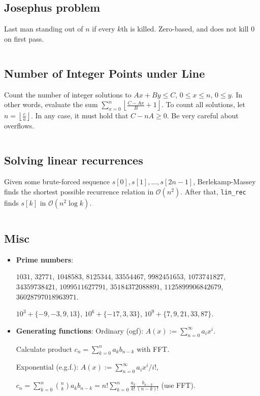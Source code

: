 \documentclass[8pt,a4paper,landscape,oneside]{amsart}
\newcommand{\mintedstyle}[2]{\inputminted[fontsize=\normalsize,baselinestretch=.9,breaklines,tabsize=2]{#1}{code/#2}}
\newcommand{\code}[1]{\mintedstyle{cpp}{#1}}
\newenvironment{myitemize}
{\begin{itemize}[leftmargin=.3cm]
	\setlength{\itemsep}{0pt}
	\setlength{\parskip}{0pt}
	\setlength{\parsep}{0pt}     }
{ \end{itemize}                  }
\begin{document}
\begin{multicols*}{3}
\subsection{Josephus problem}
Last man standing out of $n$ if every $k$th is killed. Zero-based, and
does not kill $0$ on first pass.
\code{math/josephus.cpp}

\subsection{Number of Integer Points under Line}
Count the number of integer solutions to $Ax+By\leq C$, $0 \leq x \leq
n$, $0 \leq y$. In other words, evaluate the sum $\sum_{x=0}^n
\left\lfloor \frac{C-Ax}{B} + 1\right\rfloor$. To count all solutions,
let $n = \left\lfloor \frac{c}{a}\right\rfloor$. In any case, it must hold
that $C-nA \geq 0$. Be very careful about overflows.
\code{math/floor_sum.cpp}

\subsection{Solving linear recurrences}
Given some brute-forced sequence $s[0], s[1], \dots, s[2n-1]$, Berlekamp-Massey finds the shortest possible recurrence relation in $\mathcal{O}(n^2)$.
After that, \texttt{lin\_rec} finds $s[k]$ in $\mathcal{O}(n^2 \log k)$.
\code{other/berlekamp-massey.cpp}

\subsection{Misc}

\begin{myitemize}
	\item \textbf{Prime numbers}:

	$1031$, $32771$, $1048583$, $8125344$, $33554467$, $9982451653$, $1073741827$, $34359738421$, $1099511627791$, $35184372088891$, $1125899906842679$, $36028797018963971$.

	$10^3 + \{-9,-3,9,13\}$, $10^6 + \{-17,3,33\}$, $10^9+ \{7,9,21,33,87\}$.

	\item \textbf{Generating functions}:
	Ordinary (ogf): $A(x) := \sum_{n=0}^{\infty} a_i x^i$.

	Calculate product $c_n = \sum_{k=0}^{n} a_k b_{n-k}$ with FFT.

	Exponential (e.g.f.): $A(x) := \sum_{n=0}^{\infty} a_i x^i/i!$,

	$c_n = \sum_{k=0}^{n} \binom{n}{k} a_k b_{n-k} = n! \sum_{k=0}^{n} \frac{a_k}{k!} \frac{b_{n-k}}{(n-k)!}$ (use FFT).


\end{myitemize}
\end{multicols*}
\end{document}
